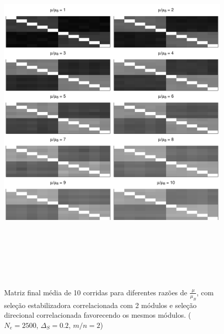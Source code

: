 \documentclass[a4paper, 12pt, titlepage, onecolumn]{article}
\numberwithin{equation}{section}
\numberwithin{table}{section}
\begin{document}
\begin{center}
\begin{figure}[H]
  \includegraphics[width=150mm, height=180mm]{figuras/MatBDirecRMu}
   \caption{Matriz final média de 10 corridas para diferentes razões de
   $\frac{\mu}{\mu_B}$, com seleção estabilizadora correlacionada com 2
   módulos e seleção direcional correlacionada favorecendo os mesmos
   módulos. ($N_e=2500$, $\Delta_S=0.2$, $m/n=2$)}
  \label{MatBDirecional-RMu}
\end{figure}
\end{center}
\end{document}
